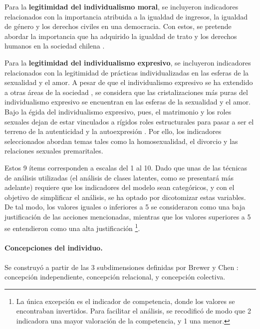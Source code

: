 \documentclass[12pt,oneside]{templates/facsothesis}
\begin{document}
Para la \textbf{legitimidad del individualismo moral}, se incluyeron indicadores relacionados con la importancia atribuida a la igualdad de ingresos, la igualdad de género y los derechos civiles en una democracia. Con estos, se pretende abordar la importancia que ha adquirido la igualdad de trato y los derechos humanos en la sociedad chilena \citep{araujo2012, araujo2020a}.

Para la \textbf{legitimidad del individualismo expresivo}, se incluyeron indicadores relacionados con la legitimidad de prácticas individualizadas en las esferas de la sexualidad y el amor. A pesar de que el individualismo expresivo se ha extendido a otras áreas de la sociedad \citep{gauthier2021}, se considera que las cristalizaciones más puras del individualismo expresivo se encuentran en las esferas de la sexualidad y el amor. Bajo la égida del individualismo expresivo, pues, el matrimonio y los roles sexuales dejan de estar vinculados a rígidos roles estructurales para pasar a ser el terreno de la autenticidad y la autoexpresión \citep{illouz2020}. Por ello, los indicadores seleccionados abordan temas tales como la homosexualidad, el divorcio y las relaciones sexuales premaritales.

Estos 9 ítems corresponden a escalas del 1 al 10. Dado que unas de las técnicas de análisis utilizadas (el análisis de clases latentes, como se presentará más adelante) requiere que los indicadores del modelo sean categóricos, y con el objetivo de simplificar el análisis, se ha optado por dicotomizar estas variables. De tal modo, los valores iguales o inferiores a 5 se consideraron como una baja justificación de las acciones mencionadas, mientras que los valores superiores a 5 se entendieron como una alta justificación \footnote{La única excepción es el indicador de competencia, donde los valores se encontraban invertidos. Para facilitar el análisis, se recodificó de modo que 2 indicadora una mayor valoración de la competencia, y 1 una menor.}.

\hypertarget{concepciones-del-individuo.}{%
\paragraph*{Concepciones del individuo.}\label{concepciones-del-individuo.}}

Se construyó a partir de las 3 subdimensiones definidas por Brewer y Chen \citeyearpar{brewer2007}: concepción independiente, concepción relacional, y concepción colectiva.
\end{document}
